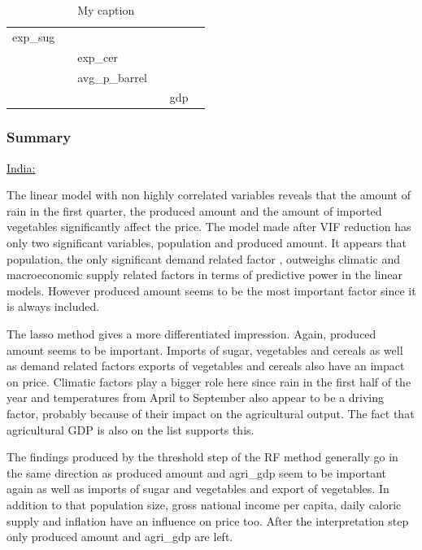 \documentclass[12pt,a4paper,english]{article}
\begin{document}
\begin{table}[!htbp]
\begin{adjustbox}{max width=\textwidth}
\begin{tabular}{llllll}
exp\_sug               &                           &                        &                           &                      &                           \\ 
                       &                           & exp\_cer               &                           &                      &                           \\ 
                       &                           & avg\_p\_barrel         &                           &                      &                           \\ 
                       &                           &                        &                           & gdp                  &                          \\ \hline
\end{tabular}
\end{adjustbox}
\caption{My caption}
\label{my-label}
\end{table}
\FloatBarrier

\subsubsection{Summary}

\begin{center} \underline{India:} \end{center}
The linear model with non highly correlated variables reveals that the amount of rain in the first quarter, the produced amount and the amount of imported vegetables significantly affect the price. 
The model made after VIF reduction has only two significant variables, population and produced amount. It appears that population, the only significant demand related factor , outweighs climatic and macroeconomic supply related factors in terms of predictive power in the linear models. However produced amount seems to be the most important factor since it is always included.

The lasso method gives a more differentiated impression.
Again, produced amount seems to be important. Imports of sugar, vegetables and cereals as well as demand related factors exports of vegetables and cereals also have an impact on price. Climatic factors play a bigger role here since rain in the first half of the year and temperatures from April to September also appear to be a driving factor, probably because of their impact on the agricultural output. The fact that agricultural GDP is also on the list supports this.

The findings produced by the threshold step of the RF method generally go in the same direction as produced amount and agri\_gdp seem to be important again as well as imports of sugar and vegetables and export of vegetables. In addition to that population size, gross national income per capita, daily caloric supply and inflation have an influence on price too. After the interpretation step only produced amount and agri\_gdp are left.
\end{document}
